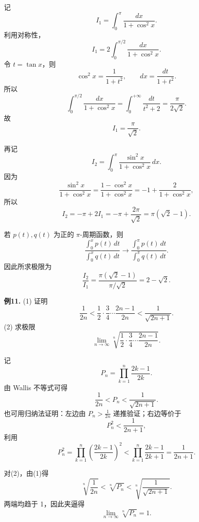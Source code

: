 \begin{solutionblock}

记
\[
I_1=\int_0^\pi\frac{dx}{1+\cos^2x}.
\]
利用对称性，
\[
I_1=2\int_0^{\pi/2}\frac{dx}{1+\cos^2x}.
\]
令 \(t=\tan x\)，则
\[
\cos^2x=\frac1{1+t^2},\qquad dx=\frac{dt}{1+t^2}.
\]
所以
\[
\int_0^{\pi/2}\frac{dx}{1+\cos^2x}
=\int_0^{+\infty}\frac{dt}{t^2+2}
=\frac{\pi}{2\sqrt2}.
\]
故
\[
I_1=\frac{\pi}{\sqrt2}.
\]

再记
\[
I_2=\int_0^\pi\frac{\sin^2x}{1+\cos^2x}\,dx.
\]
因为
\[
\frac{\sin^2x}{1+\cos^2x}
=\frac{1-\cos^2x}{1+\cos^2x}
=-1+\frac{2}{1+\cos^2x},
\]
所以
\[
I_2=-\pi+2I_1
=-\pi+\frac{2\pi}{\sqrt2}
=\pi(\sqrt2-1).
\]

若 \(p(t),q(t)\) 为正的 \(\pi\)-周期函数，则
\[
\frac{\int_0^x p(t)\,dt}{\int_0^x q(t)\,dt}
\to
\frac{\int_0^\pi p(t)\,dt}{\int_0^\pi q(t)\,dt}.
\]
因此所求极限为
\[
\frac{I_2}{I_1}
=\frac{\pi(\sqrt2-1)}{\pi/\sqrt2}
=2-\sqrt2.
\]

\end{solutionblock}

\begin{problemblock}
\textbf{例11.} (1) 证明
\[
\frac1{2n}<\frac12\cdot\frac34\cdots\frac{2n-1}{2n}<\frac1{\sqrt{2n+1}}.
\]
(2) 求极限
\[
\lim_{n\to\infty}\sqrt[n]{\frac12\cdot\frac34\cdots\frac{2n-1}{2n}}.
\]
\end{problemblock}

\begin{solutionblock}

记
\[
P_n=\prod_{k=1}^n\frac{2k-1}{2k}.
\]
由 Wallis 不等式可得
\[
\frac1{2n}<P_n<\frac1{\sqrt{2n+1}}.
\]
也可用归纳法证明：左边由 \(P_n>\frac1{2n}\) 递推验证；右边等价于
\[
P_n^2<\frac1{2n+1},
\]
利用
\[
P_n^2=\prod_{k=1}^n\left(\frac{2k-1}{2k}\right)^2
<\prod_{k=1}^n\frac{2k-1}{2k+1}
=\frac1{2n+1}.
\]

对(2)，由(1)得
\[
\sqrt[n]{\frac1{2n}}<\sqrt[n]{P_n}<\sqrt[n]{\frac1{\sqrt{2n+1}}}.
\]
两端均趋于 1，因此夹逼得
\[
\lim_{n\to\infty}\sqrt[n]{P_n}=1.
\]

\end{solutionblock}

